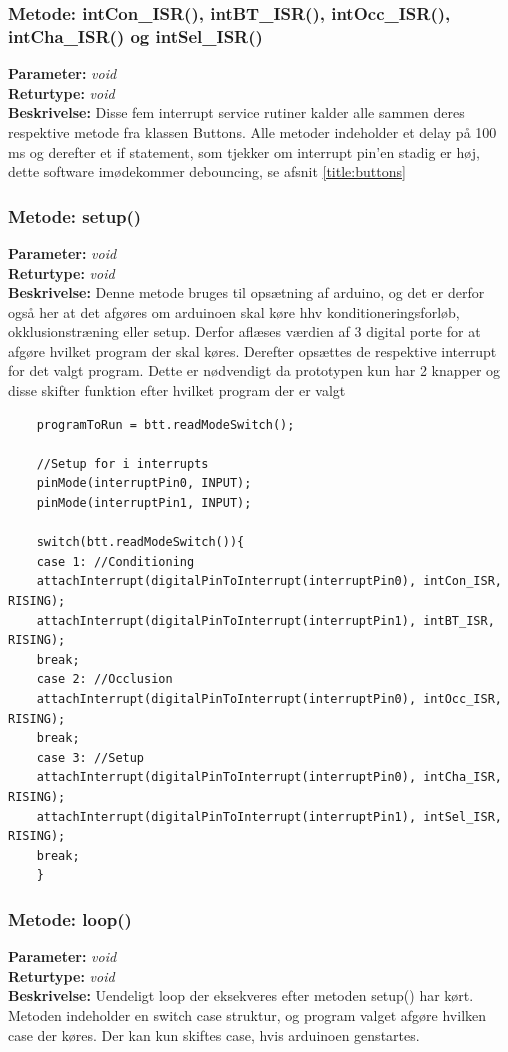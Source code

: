 \subsubsection{Metode: intCon\_ISR(), intBT\_ISR(), intOcc\_ISR(), intCha\_ISR() og intSel\_ISR()}
\textbf{Parameter: } \textit{void}
\\ \textbf{Returtype: } \textit{void}
\\ \textbf{Beskrivelse: } Disse fem interrupt service rutiner kalder alle sammen deres respektive metode fra klassen Buttons. Alle metoder indeholder et delay på 100 ms og derefter et if statement, som tjekker om interrupt pin’en stadig er høj, dette software imødekommer debouncing, se afsnit \ref{title:buttons}


\subsubsection{Metode: setup()}
\textbf{Parameter: } \textit{void}
\\ \textbf{Returtype: } \textit{void}
\\ \textbf{Beskrivelse: } Denne metode bruges til opsætning af arduino, og det er derfor også her at det afgøres om arduinoen skal køre hhv konditioneringsforløb, okklusionstræning eller setup. Derfor aflæses værdien af 3 digital porte for at afgøre hvilket program der skal køres. Derefter opsættes de respektive interrupt for det valgt program. Dette er nødvendigt da prototypen kun har 2 knapper og disse skifter funktion efter hvilket program der er valgt
\begin{lstlisting}
	programToRun = btt.readModeSwitch();
	
	//Setup for i interrupts
	pinMode(interruptPin0, INPUT);
	pinMode(interruptPin1, INPUT);
	
	switch(btt.readModeSwitch()){
	case 1: //Conditioning
	attachInterrupt(digitalPinToInterrupt(interruptPin0), intCon_ISR, RISING);
	attachInterrupt(digitalPinToInterrupt(interruptPin1), intBT_ISR, RISING);
	break;
	case 2: //Occlusion
	attachInterrupt(digitalPinToInterrupt(interruptPin0), intOcc_ISR, RISING);
	break;
	case 3: //Setup
	attachInterrupt(digitalPinToInterrupt(interruptPin0), intCha_ISR, RISING);
	attachInterrupt(digitalPinToInterrupt(interruptPin1), intSel_ISR, RISING);
	break;
	}
\end{lstlisting}

\subsubsection{Metode: loop()}
\textbf{Parameter: } \textit{void}
\\ \textbf{Returtype: } \textit{void}
\\ \textbf{Beskrivelse: } Uendeligt loop der eksekveres efter metoden setup() har kørt. Metoden indeholder en switch case struktur, og program valget afgøre hvilken case der køres. Der kan kun skiftes case, hvis arduinoen genstartes. 